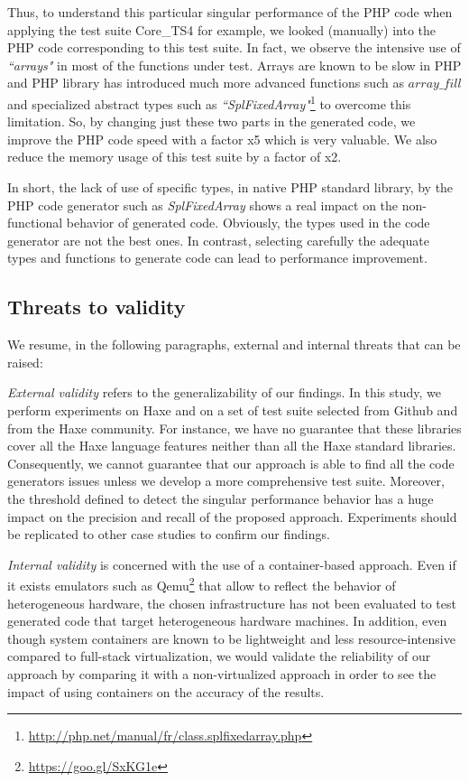 Thus, to understand this particular singular performance of the PHP code when applying the test suite Core\_TS4 for example, we looked (manually) into the PHP code corresponding to this test suite. In fact, we observe the intensive use of \textit{``arrays"} in most of the functions under test. Arrays are known to be slow in PHP and PHP library has introduced much more advanced functions such as $array\_fill$ and specialized abstract types such as \textit{``SplFixedArray"}\footnote{\url{http://php.net/manual/fr/class.splfixedarray.php}} to overcome this limitation. So, by changing just these two parts in the generated code, we improve the PHP code speed with a factor x5 which is very valuable. We also reduce the memory usage of this test suite by a factor of x2.

In short, the lack of use of specific types, in native PHP standard library, by the PHP code generator such as \textit{SplFixedArray} shows a real impact on the non-functional behavior of generated code. Obviously, the types used in the code generator are not the best ones. In contrast, selecting carefully the adequate types and functions to generate code can lead to performance improvement. 

\subsection{Threats to validity}
We resume, in the following paragraphs, external and internal threats that can be raised:

\textit{External validity} refers to the generalizability of our findings. In this study, we perform experiments on Haxe and on a set of test suite selected from Github and from the Haxe community. For instance, we have no guarantee that these libraries cover all the Haxe language features neither than all the Haxe standard libraries. Consequently, we cannot guarantee that our approach is able to find all the code generators issues unless we develop a more comprehensive test suite. Moreover, the threshold defined to detect the singular performance behavior has a huge impact on the precision and recall of the proposed approach. Experiments should be replicated to other case studies to confirm our findings.

\textit{Internal validity} is concerned with the use of a container-based approach. Even if it exists emulators such as Qemu\footnote{\url{https://goo.gl/SxKG1e}} that allow to reflect the behavior of heterogeneous hardware, the chosen infrastructure has not been evaluated to test generated code that target heterogeneous hardware machines. In addition, even though system containers are known to be lightweight and less resource-intensive compared to full-stack virtualization, we would validate the reliability of our approach by comparing it with a non-virtualized approach in order to see the impact of using containers on the accuracy of the results.



